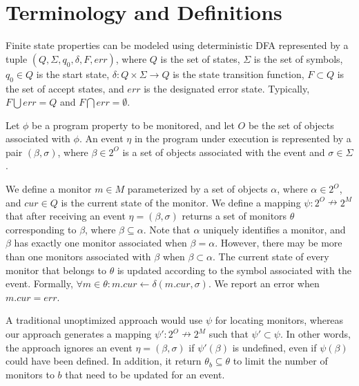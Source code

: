 \section{Terminology and Definitions}
\label{sec:definition}


Finite state properties can be modeled using deterministic DFA 
represented by a tuple $(Q, \Sigma, q_0, \delta, F, err)$, where 
$Q$ is the set of states, $\Sigma$ is the set of symbols, $q_0 \in Q$ is the 
start state, $\delta : Q \times \Sigma \to Q$ is the state transition function, 
$F \subset Q$ is the set of accept states, and $err$ is the designated error 
state. Typically, $F \bigcup err = Q$ and $F \bigcap err = \emptyset$. 

Let $\phi$ be a program property to be monitored, and let $O$ be the set of 
objects associated with $\phi$.  An event $\eta$ in the program under execution 
is represented by a pair $(\beta, \sigma)$, where $\beta \in 2^O$ is a set of 
objects associated with the event and $\sigma \in \Sigma$.

We define a monitor $m \in M$ parameterized by a set of objects $\alpha$, where 
$\alpha \in 2^O$, and $cur \in Q$ is the current state of the monitor. We define 
a mapping $\psi : 2^O \nrightarrow 2^M$ that after receiving an event $\eta = 
(\beta, \sigma)$ returns a set of monitors $\theta$ corresponding to $\beta$, 
where $\beta \subseteq \alpha$. Note that $\alpha$ uniquely identifies a monitor,
and $\beta$ has exactly one monitor associated when $\beta  = \alpha$. However,
there may be more than one monitors associated with $\beta$ 
when $\beta \subset \alpha$. The current state of every monitor that belongs to
$\theta$ is updated according to the symbol associated with the event. Formally, 
$\forall m \in \theta: m.cur \leftarrow \delta(m.cur, \sigma)$. We report an 
error when $m.cur = err$.

 A traditional unoptimized approach would use $\psi$ 
for locating monitors, whereas our approach generates a mapping $\psi': 2^O 
\nrightarrow 2^M$ such that $\psi' \subset \psi$. In other words, the approach 
ignores an event $\eta = (\beta, \sigma)$ if $\psi'(\beta)$ is undefined, even 
if $\psi(\beta)$ could have been defined. In addition, it return $\theta_b \subseteq \theta$ 
to limit the number of monitors to $b$ that need to be updated for an event.

